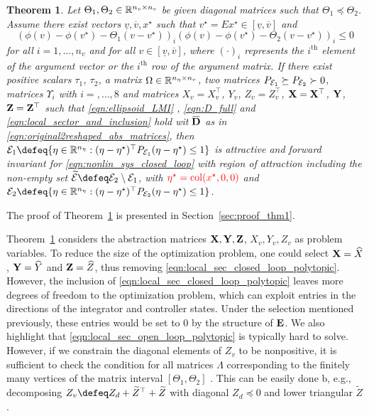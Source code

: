 \documentclass{ifacconf}
\newtheorem{theorem}{Theorem}
\begin{document}
\begin{theorem}\label{thm:invariant_ellipsoid_local_sect}
Let $\Theta_1,\Theta_2\in{\mathbb{R}}^{n_v\times n_v}$ be given diagonal matrices such that $\Theta_1\preceq\Theta_2$. Assume there exist vectors $\underline v, \overbar v, x^\star$ such that $v^\star = Ex^\star \in[\underline v, \overbar v]$ and
\begin{equation}
    \label{eqn:local_sector_v}
   (\phi(v)-\phi(v^\star) -\Theta_1(v-v^\star))_i
   (\phi(v)-\phi(v^\star) -\Theta_2(v-v^\star))_i\le0
\end{equation}
for all $i=1,\dots,n_v$ and for all $v\in[\underline v, \overbar v]$, where $(\cdot)_i$ represents the $i^{\text{th}}$ element of the argument vector or the $i^{\text{th}}$ row of the argument matrix. If there exist positive scalars $\tau_1$, $\tau_2$, a matrix $\Omega\in{\mathbb{R}}^{n_\eta\times n_v}$, two matrices $P_{{\mathcal{E}}_1}\succeq P_{{\mathcal{E}}_2}\succ 0$, matrices $\Upsilon_i$ with $i=,\dots, 8$  and matrices $X_v=X_v^\top$, $Y_v$, $ Z_v= Z_v^\top$, ${\bf{X}}={\bf{X}}^\top$, ${\bf{Y}}$, $ {\bf{Z}}= {\bf{Z}}^\top$ such that \eqref{eqn:ellipsoid_LMI} , \eqref{eqn:D_full}
and \eqref{eqn:local_sector_and_inclusion} hold wit $\overbar \bD$ as in \eqref{eqn:original2reshaped_abs_matrices}, then $\cE_1\defeq\{\eta\in\RR^{n_\eta}:(\eta-\eta^\star)^\top P_{\cE_1} (\eta-\eta^\star) \le 1\}$ is  attractive and forward invariant for \eqref{eqn:nonlin_sys_closed_loop} with region of attraction including the  non-empty set $\widetilde\cE\defeq \cE_2\setminus\cE_1$, with 
${\color{red}\eta^\star=\operatorname{col}(x^\star, 0, 0)}$ and
$\cE_2\defeq\{\eta\in\RR^{n_\eta}:(\eta-\eta^\star)^\top P_{\cE_2} (\eta-\eta^\star) \le 1\}$.
\end{theorem}
The proof of Theorem~\ref{thm:invariant_ellipsoid_local_sect} is presented in Section~\ref{sec:proof_thm1}.

Theorem~\ref{thm:invariant_ellipsoid_local_sect} considers the abstraction matrices ${\bf{X}},{\bf{Y}},{\bf{Z}}$, $X_v, Y_v, Z_v$ as problem variables. To reduce the size of the optimization problem, one could select ${\bf{X}}=\widehat X$,  $ {\bf{Y}} =  \widehat Y$  and ${\bf{Z}}= \widehat Z$, thus removing \eqref{eqn:local_sec_closed_loop_polytopic}. However, the inclusion of \eqref{eqn:local_sec_closed_loop_polytopic} leaves more degrees of freedom to the optimization problem, which can exploit entries in the directions of the integrator and controller states. Under the selection mentioned previously, these entries would be set to $0$ by the structure of ${\bf{E}}$. We also highlight that \eqref{eqn:local_sec_open_loop_polytopic} is typically hard to solve. However, if we constrain the diagonal elements of $Z_v$ to be nonpositive, it is sufficient to check the condition for all
matrices $\Lambda$ corresponding to the finitely many vertices
of the matrix interval $[\Theta_1,\Theta_2]$ \citep{ebihara2021stability}. This can be easily done b, e.g., decomposing $Z_v\defeq Z_d + \widetilde Z^\top + \widetilde Z$ with diagonal $Z_d\preceq 0$ and lower triangular $\widetilde Z$.
\end{document}
